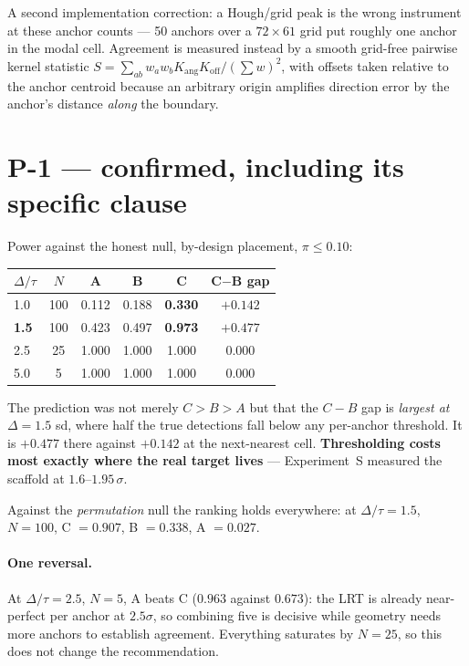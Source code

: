 \documentclass[11pt]{article}
\begin{document}
A second implementation correction: a Hough/grid peak is the wrong instrument at these anchor
counts --- 50 anchors over a $72 \times 61$ grid put roughly one anchor in the modal cell.
Agreement is measured instead by a smooth grid-free pairwise kernel statistic
$S = \sum_{ab} w_a w_b K_{\text{ang}} K_{\text{off}} / (\sum w)^2$, with offsets taken relative to
the anchor centroid because an arbitrary origin amplifies direction error by the anchor's distance
\emph{along} the boundary.

\section{P-1 --- confirmed, including its specific clause}

Power against the honest null, by-design placement, $\pi \le 0.10$:

\begin{table}[h]
\small\centering
\begin{tabular}{@{}lccccc@{}}
\toprule
$\Delta/\tau$ & $N$ & A & B & \textbf{C} & \textbf{C$-$B gap}\\
\midrule
1.0 & 100 & 0.112 & 0.188 & \textbf{0.330} & $+0.142$\\
\textbf{1.5} & 100 & 0.423 & 0.497 & \textbf{0.973} & $\bm{+0.477}$\\
2.5 & 25 & 1.000 & 1.000 & 1.000 & $0.000$\\
5.0 & 5 & 1.000 & 1.000 & 1.000 & $0.000$\\
\bottomrule
\end{tabular}
\end{table}

\noindent The prediction was not merely $C > B > A$ but that the $C-B$ gap is \emph{largest at}
$\Delta = 1.5$ sd, where half the true detections fall below any per-anchor threshold. It is
$+0.477$ there against $+0.142$ at the next-nearest cell. \textbf{Thresholding costs most exactly
where the real target lives} --- Experiment~S measured the scaffold at $1.6$--$1.95\,\sigma$.

Against the \emph{permutation} null the ranking holds everywhere: at $\Delta/\tau = 1.5$,
$N = 100$, C $= 0.907$, B $= 0.338$, A $= 0.027$.

\paragraph{One reversal.} At $\Delta/\tau = 2.5$, $N = 5$, A beats C ($0.963$ against $0.673$):
the LRT is already near-perfect per anchor at $2.5\sigma$, so combining five is decisive while
geometry needs more anchors to establish agreement. Everything saturates by $N = 25$, so this does
not change the recommendation.
\end{document}
